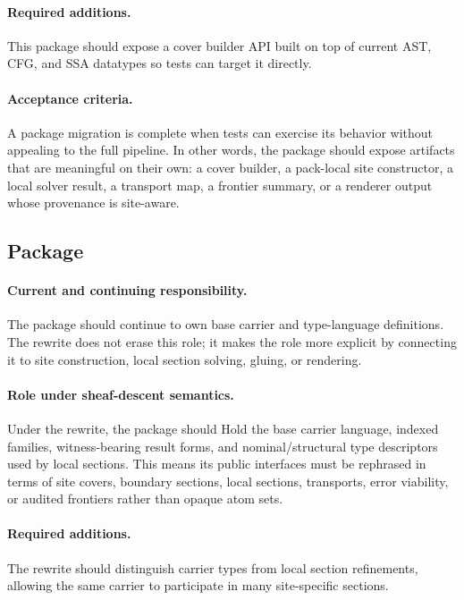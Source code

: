 \documentclass[11pt]{report}
\DeclareRobustCommand{\py}[1]{\texttt{\detokenize{#1}}}
\theoremstyle{definition}
\theoremstyle{plain}
\begin{document}
\paragraph{Required additions.}
This package should expose a cover builder API built on top of current AST, CFG, and SSA datatypes so tests can target it directly.

\paragraph{Acceptance criteria.}
A package migration is complete when tests can exercise its behavior without
appealing to the full pipeline. In other words, the package should expose
artifacts that are meaningful on their own: a cover builder, a pack-local
site constructor, a local solver result, a transport map, a frontier summary,
or a renderer output whose provenance is site-aware.

\subsection{Package \py{src/deppy/types}}

\paragraph{Current and continuing responsibility.}
The package \py{src/deppy/types} should continue to own base carrier and type-language definitions. The
rewrite does not erase this role; it makes the role more explicit by
connecting it to site construction, local section solving, gluing, or
rendering.

\paragraph{Role under sheaf-descent semantics.}
Under the rewrite, the package should Hold the base carrier language, indexed families, witness-bearing result forms, and nominal/structural type descriptors used by local sections. This means its public
interfaces must be rephrased in terms of site covers, boundary sections,
local sections, transports, error viability, or audited frontiers rather
than opaque atom sets.

\paragraph{Required additions.}
The rewrite should distinguish carrier types from local section refinements, allowing the same carrier to participate in many site-specific sections.
\end{document}
